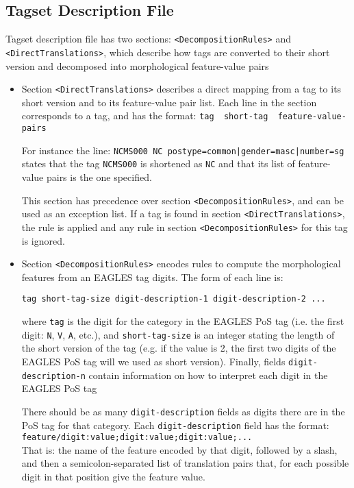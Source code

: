 \documentclass[a4paper]{book}
\begin{document}
\subsection{Tagset Description File}

  Tagset description file has two sections: \verb#<DecompositionRules># 
  and \verb#<DirectTranslations>#, which describe how tags are converted to their 
  short version and decomposed into morphological feature-value pairs

   \begin{itemize}
   \item Section \verb#<DirectTranslations># describes a direct mapping from a tag 
    to its short version and to its feature-value pair list. Each line in the section
    corresponds to a tag, and has the format: \verb#tag  short-tag  feature-value-pairs#

    For instance the line: \verb#NCMS000 NC postype=common|gender=masc|number=sg#
    states that the tag \verb#NCMS000# is shortened as \verb#NC# and that its list
    of feature-value pairs is the one specified. 
    
    This section has precedence over section
    \verb#<DecompositionRules>#, and can be used as an exception list.
    If a tag is found in section \verb#<DirectTranslations>#, the rule
    is applied and any rule in section \verb#<DecompositionRules># for
    this tag is ignored.

   \item Section \verb#<DecompositionRules># encodes rules to compute the morphological features
    from an EAGLES tag digits. The form of each line is:
\begin{verbatim}
tag short-tag-size digit-description-1 digit-description-2 ...
\end{verbatim}
    where \verb#tag# is the digit for the category in the EAGLES PoS
    tag (i.e. the first digit: \verb#N#, \verb#V#, \verb#A#, etc.),
    and \verb#short-tag-size# is an integer stating the length of the
    short version of the tag (e.g. if the value is 2, the first two
    digits of the EAGLES PoS tag will we used as short
    version). Finally, fields \verb#digit-description-n# contain
    information on how to interpret each digit in the EAGLES PoS tag

    There should be as many \verb#digit-description# fields as digits
    there are in the PoS tag for that category. Each
    \verb#digit-description# field has the format:\\
    \verb#feature/digit:value;digit:value;digit:value;...#\\
    That is: the name of the feature encoded by that digit, followed by a
    slash, and then a semicolon-separated list of translation pairs
    that, for each possible digit in that position give the feature
    value.


\end{itemize}
\end{document}
